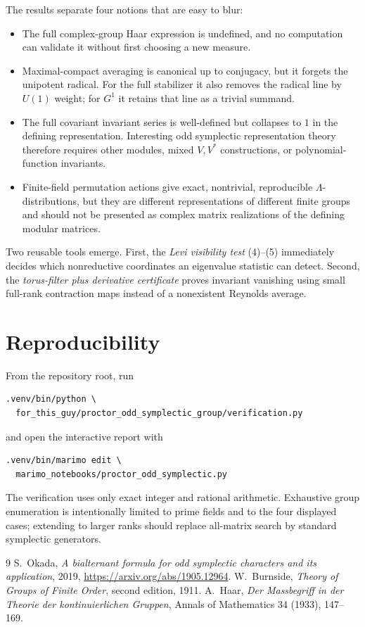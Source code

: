 \documentclass[11pt]{article}
\begin{document}
The results separate four notions that are easy to blur:
\begin{itemize}[leftmargin=*,itemsep=3pt]
\item The full complex-group Haar expression is undefined, and no computation
can validate it without first choosing a new measure.
\item Maximal-compact averaging is canonical up to conjugacy, but it forgets
the unipotent radical. For the full stabilizer it also removes the radical
line by $U(1)$ weight; for $G^1$ it retains that line as a trivial summand.
\item The full covariant invariant series is well-defined but collapses to $1$
in the defining representation. Interesting odd symplectic representation
theory therefore requires other modules, mixed $V,V^*$ constructions, or
polynomial-function invariants.
\item Finite-field permutation actions give exact, nontrivial, reproducible
$\Lambda$-distributions, but they are different representations of different
finite groups and should not be presented as complex matrix realizations of
the defining modular matrices.
\end{itemize}

Two reusable tools emerge. First, the \emph{Levi visibility test} (4)--(5)
immediately decides which nonreductive coordinates an eigenvalue statistic can
detect. Second, the \emph{torus-filter plus derivative certificate} proves
invariant vanishing using small full-rank contraction maps instead of a
nonexistent Reynolds average.

\section{Reproducibility}

From the repository root, run
\begin{verbatim}
.venv/bin/python \
  for_this_guy/proctor_odd_symplectic_group/verification.py
\end{verbatim}
and open the interactive report with
\begin{verbatim}
.venv/bin/marimo edit \
  marimo_notebooks/proctor_odd_symplectic.py
\end{verbatim}
The verification uses only exact integer and rational arithmetic. Exhaustive
group enumeration is intentionally limited to prime fields and to the four
displayed cases; extending to larger ranks should replace all-matrix search by
standard symplectic generators.

\begin{thebibliography}{9}
S.~Okada, \emph{A bialternant formula for odd symplectic characters and its
application}, 2019, \url{https://arxiv.org/abs/1905.12964}.
\bibitem{Burnside}
W.~Burnside, \emph{Theory of Groups of Finite Order}, second edition, 1911.
\bibitem{Haar}
A.~Haar, \emph{Der Massbegriff in der Theorie der kontinuierlichen Gruppen},
Annals of Mathematics 34 (1933), 147--169.
\end{thebibliography}
\end{document}
